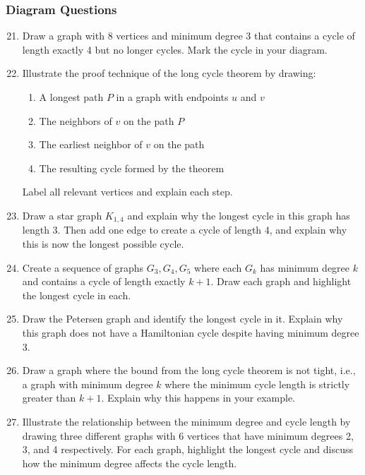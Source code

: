 \documentclass{article}
\theoremstyle{definition}
\begin{document}
\subsubsection{Diagram Questions}
\begin{enumerate}\setcounter{enumi}{20}
\item Draw a graph with 8 vertices and minimum degree 3 that contains a cycle of length exactly 4 but no longer cycles. Mark the cycle in your diagram.

\item Illustrate the proof technique of the long cycle theorem by drawing:
\begin{enumerate}
\item A longest path $P$ in a graph with endpoints $u$ and $v$
\item The neighbors of $v$ on the path $P$
\item The earliest neighbor of $v$ on the path
\item The resulting cycle formed by the theorem
\end{enumerate}
Label all relevant vertices and explain each step.

\item Draw a star graph $K_{1,4}$ and explain why the longest cycle in this graph has length 3. Then add one edge to create a cycle of length 4, and explain why this is now the longest possible cycle.

\item Create a sequence of graphs $G_3, G_4, G_5$ where each $G_k$ has minimum degree $k$ and contains a cycle of length exactly $k+1$. Draw each graph and highlight the longest cycle in each.

\item Draw the Petersen graph and identify the longest cycle in it. Explain why this graph does not have a Hamiltonian cycle despite having minimum degree 3.

\item Draw a graph where the bound from the long cycle theorem is not tight, i.e., a graph with minimum degree $k$ where the minimum cycle length is strictly greater than $k+1$. Explain why this happens in your example.

\item Illustrate the relationship between the minimum degree and cycle length by drawing three different graphs with 6 vertices that have minimum degrees 2, 3, and 4 respectively. For each graph, highlight the longest cycle and discuss how the minimum degree affects the cycle length.
\end{enumerate}
\end{document}
